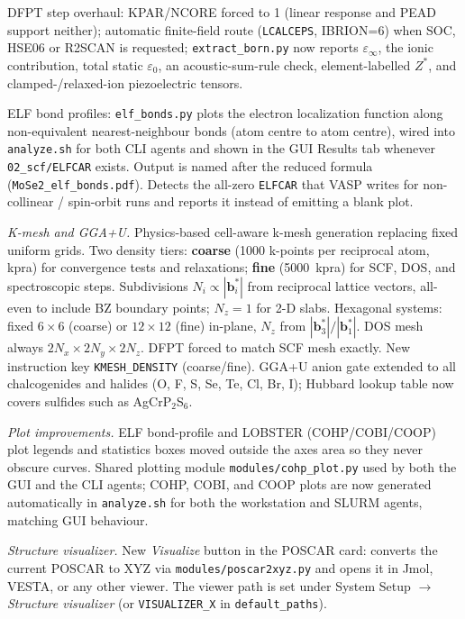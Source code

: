 \documentclass[11pt,a4paper]{scrartcl}
\begin{document}
\begin{description}
    DFPT step overhaul: KPAR/NCORE forced to 1 (linear response and
    PEAD support neither); automatic finite-field route
    (\texttt{LCALCEPS}, IBRION=6) when SOC, HSE06 or R2SCAN is
    requested; \texttt{extract\_born.py} now reports
    $\varepsilon_{\infty}$, the ionic contribution, total static
    $\varepsilon_{0}$, an acoustic-sum-rule check, element-labelled
    $Z^{*}$, and clamped-/relaxed-ion piezoelectric tensors.
  \item[\textcolor{mainblue}{v1.8} (2026-07-09)]
    ELF bond profiles: \texttt{elf\_bonds.py} plots the electron localization
    function along non-equivalent nearest-neighbour bonds (atom centre to atom
    centre), wired into \texttt{analyze.sh} for both CLI agents and shown in the
    GUI Results tab whenever \texttt{02\_scf/ELFCAR} exists.  Output is named
    after the reduced formula (\texttt{MoSe2\_elf\_bonds.pdf}).  Detects the
    all-zero \texttt{ELFCAR} that VASP writes for non-collinear / spin-orbit
    runs and reports it instead of emitting a blank plot.
  \item[\textcolor{mainblue}{v1.9} (2026-07-22)]
    \textit{K-mesh and GGA+U.}
    Physics-based cell-aware k-mesh generation replacing fixed uniform grids.
    Two density tiers: \textbf{coarse} (1000 k-points per reciprocal atom,
    kpra) for convergence tests and relaxations; \textbf{fine} (5000~kpra) for
    SCF, DOS, and spectroscopic steps.  Subdivisions $N_i \propto |\mathbf{b}_i^*|$
    from reciprocal lattice vectors, all-even to include BZ boundary points;
    $N_z = 1$ for 2-D slabs.  Hexagonal systems: fixed $6{\times}6$ (coarse)
    or $12{\times}12$ (fine) in-plane, $N_z$ from $|\mathbf{b}_3^*|/|\mathbf{b}_1^*|$.
    DOS mesh always $2N_x{\times}2N_y{\times}2N_z$.  DFPT forced to match SCF
    mesh exactly.  New instruction key \texttt{KMESH\_DENSITY} (coarse/fine).
    GGA+U anion gate extended to all chalcogenides and halides
    (O, F, S, Se, Te, Cl, Br, I); Hubbard lookup table now covers sulfides
    such as AgCrP$_2$S$_6$.

    \textit{Plot improvements.}
    ELF bond-profile and LOBSTER (COHP/COBI/COOP) plot legends and statistics
    boxes moved outside the axes area so they never obscure curves.
    Shared plotting module \texttt{modules/cohp\_plot.py} used by both the
    GUI and the CLI agents; COHP, COBI, and COOP plots are now generated
    automatically in \texttt{analyze.sh} for both the workstation and SLURM
    agents, matching GUI behaviour.

    \textit{Structure visualizer.}
    New \emph{Visualize} button in the POSCAR card: converts the current
    POSCAR to XYZ via \texttt{modules/poscar2xyz.py} and opens it in
    Jmol, VESTA, or any other viewer.  The viewer path is set under
    System Setup $\to$ \emph{Structure visualizer} (or \texttt{VISUALIZER\_X}
    in \texttt{default\_paths}).


\end{description}
\end{document}
